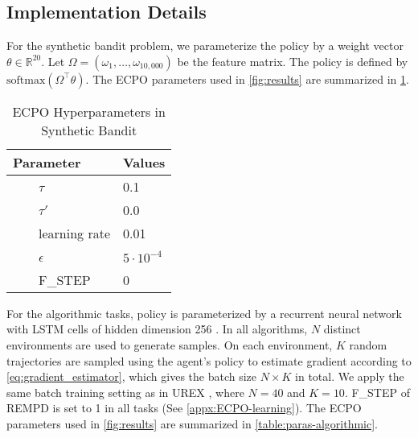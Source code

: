 \subsection{Implementation Details}
\label{subsec:implementation}
For the synthetic bandit problem, we parameterize the policy by a weight vector $\theta\in  \mathbb{R}^{20}$. Let $\Omega = \left( \omega_1, \dots, \omega_{10,000} \right)$ be the feature matrix. The policy is defined by $\text{softmax}(\Omega^{\top}\theta)$. The ECPO parameters used in \cref{fig:results} are summarized in \cref{table:paras-bandit}. 
\begin{table}[ht]
\caption{ECPO Hyperparameters in Synthetic Bandit} %
\centering 
\begin{tabular}{l l} 
\hline
Parameter & Values \\ [0.5ex] %
\hline %
\ \ \ \ $\tau$ & 0.1  \\
\ \ \ \ $\tau'$ & 0.0 \\
\ \ \ \ learning rate & 0.01 \\
\ \ \ \ $\epsilon $ & $5\cdot 10^{-4}$ \\
\ \ \ \ F\_STEP & 0 \\
\hline
\end{tabular}
\label{table:paras-bandit} %
\end{table}


For the algorithmic tasks, policy is parameterized by a recurrent neural network with LSTM cells of hidden dimension 256 \citep{hochreiter1997long}. In all algorithms, $N$ distinct environments are used to generate samples. On each environment, $K$ random trajectories are sampled using the agent's policy to estimate gradient according to \cref{eq:gradient_estimator}, which gives the batch size $N\times K$ in total. We apply the same batch training setting as in UREX \citep{nachum2017improving}, where $N=40$ and $K=10$. F\_STEP of REMPD is set to 1 in all tasks (See \cref{appx:ECPO-learning}). The ECPO parameters used in \cref{fig:results} are summarized in \cref{table:paras-algorithmic}. 

